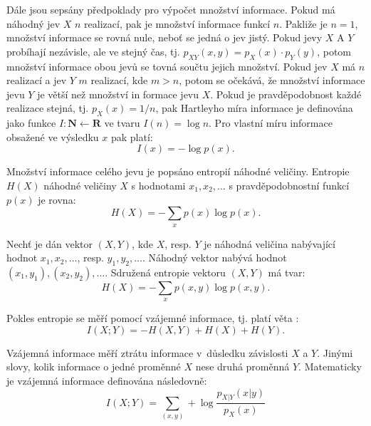 Dále jsou sepsány předpoklady pro výpočet množství informace. Pokud má náhodný jev $X$ $n$ realizací, pak je množství informace funkcí $n$. Pakliže je $n=1$, množství informace se rovná nule, neboť se jedná o jev jistý. 
Pokud jevy $X$ A $Y$ probíhají nezávisle, ale ve stejný čas, tj. $p_{XY}(x,y)=p_X(x)\cdot p_Y(y)$, potom množství informace obou jevů se tovná součtu jejich množství.
Pokud jev $X$ má $n $ realizací a jev $Y$ $m$ realizací, kde $m>n$, potom se očekává, že množství informace jevu $Y$ je větší než množství in
formace jevu $X$. \cite{bib:MI2} Pokud je pravděpodobnost každé realizace stejná, tj. $p_X(x) = 1/n$, pak  Hartleyho míra informace je definována jako funkce $I: \mathbf{N} \leftarrow \mathbf{R}$ ve tvaru $I(n)=\log n$. Pro vlastní míru informace obsažené ve výsledku $x$ pak platí: \cite{bib:MI2, bib:MI3}
 \begin{equation}
    I(x)=- \log p(x).
 \end{equation}

Množství informace celého jevu je popsáno entropií náhodné veličiny. Entropie $H(X)$ náhodné veličiny $X$ s hodnotami $x_1, x_2, \ldots $ s pravděpodobnostní funkcí $p(x)$ je rovna: \cite{bib:MI2,bib:literatura}
 \begin{equation}
    H(X) = -\sum_x p(x) \log p(x).
 \end{equation}

Nechť je dán vektor $(X,Y)$, kde $X$, resp. $Y$ je náhodná veličina nabývající hodnot $x_1, x_2, \ldots $, resp. $y_1, y_2, \ldots$. Náhodný vektor nabývá hodnot $(x_1, y_1), (x_2, y_2), \ldots $. Sdružená entropie vektoru  $(X,Y)$ má tvar: \cite{bib:MI, bib:MI3}
\begin{equation}
    H(X) = -\sum_x p(x,y) \log p(x,y).
 \end{equation}

Pokles entropie se měří pomocí vzájemné informace, tj. platí věta \cite{bib:MI3}:
\begin{equation}
    I(X;Y) = -H(X,Y)+H(X)+H(Y).
 \end{equation}

Vzájemná informace měří ztrátu informace v~důsledku závislosti $X$ a $Y$. Jinými slovy, kolik informace o jedné proměnné $X$ nese druhá proměnná $Y$. Matematicky je vzájemná informace definována následovně: \cite{bib:MI, bib:MI3, bib:literatura}
\begin{equation}
    I(X;Y) = \sum_{(x,y)} + \log \frac{p_{X\vert Y}(x\vert y)}{p_X(x)}
\end{equation}

